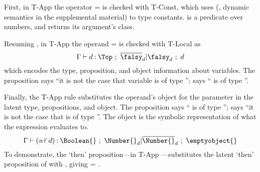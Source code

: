 First, in T-App the operator \e{} = \numberhuh{} is checked with T-Const, which
uses 
\constanttypeliteral{} (, dynamic semantics in the supplemental material)
to type constants.
\numberhuh{} is a predicate over numbers, and
\classconst{} returns its argument's class.

Resuming {},
in T-App the operand \ep{} =  is checked with
T-Local as
\begin{equation}
\judgementselfrewrite{\propenv{}}
                     {\makelocal{d}}
                     {\Top}
                     {\filterset{\notprop{\falsy}{\makelocal{d}}}
                                {\isprop{\falsy}{\makelocal{d}}}}
                     {\makelocal{d}}
\end{equation}
which encodes the type, proposition, and object information
about variables. The proposition {}
says ``it is not the case that variable {} is of type {\falsy}'';
{} says ``{} is of type {\falsy}''.

Finally, the T-App rule substitutes the operand's object \objectp{}
for the parameter \x{} in the latent type, propositions, and object. The proposition
{} says ``{} is of type {\Number{}}'';
{} says ``it is not the case that {}
is of type {\Number{}}''. The object {} is the symbolic representation
of what the expression {} evaluates to.
\begin{equation}
\judgementselfrewrite{\propenv{}}
  {\appexp{\numberhuh{}}{\makelocal{d}}}
  {\Boolean{}}
  {\filterset{\isprop{\Number{}}{\makelocal{d}}}
             {\notprop{\Number{}}{\makelocal{d}}}}
  {\emptyobject{}}
\end{equation}
To demonstrate, the `then' proposition---in T-App {\replacefor {\thenprop{\prop{}}} {\objectp{}} {\x{}}}---substitutes
the latent `then' proposition of \constanttype{\numberhuh{}} with 
, giving
{\replacefor {\isprop{\Number{}}{\x{}}} {} {\x{}}} =
{}.

